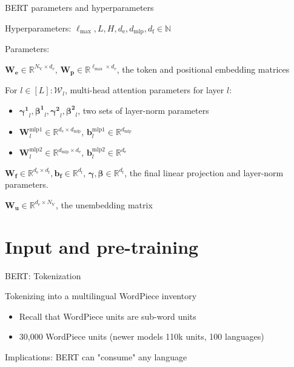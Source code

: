 \documentclass[12pt,aspectratio=169,handout]{beamer}
\begin{document}
\begin{frame}{BERT parameters and hyperparameters}
	
	\begin{minipage}[t][10cm][t]{15cm}
			
		Hyperparameters: $\ell_{\text{max}}, L, H, d_{\text{e}}, d_{\text{mlp}}, d_{\text{f}} \in \mathbb{N}$
		
		Parameters:
		
		$\bm{W_e} \in \mathbb{R}^{N_\text{V} \times d_\text{e}}$, $\bm{W_p} \in \mathbb{R}^{\ell_{\text{max}} \times d_\text{e}}$, the token and positional embedding matrices
		
		For $l \in [L]: \bm{\mathcal{W}}_l$, multi-head attention parameters for layer $l$:
		
		\begin{itemize}
		\item $\bm{\gamma^1}_l, \bm{\beta^1}_l, \bm{\gamma^2}_l, \bm{\beta^2}_l$, two sets of layer-norm parameters
		\item $\bm{W}^{\text{mlp1}}_l \in \mathbb{R}^{d_{\text{e}} \times d_\text{mlp}}$, $\bm{b}^{\text{mlp1}}_l \in \mathbb{R}^{d_\text{mlp}}$
		\item $\bm{W}^{\text{mlp2}}_l \in \mathbb{R}^{d_\text{mlp} \times d_{\text{e}}}$, $\bm{b}^{\text{mlp2}}_l \in \mathbb{R}^{d_\text{e}}$
		\end{itemize}
		
		
		
		
		$\bm{W_f} \in \mathbb{R}^{d_\text{e} \times d_\text{f}}, \bm{b_f} \in \mathbb{R}^{d_\text{f}}$, $\bm{\gamma},\bm{\beta} \in \mathbb{R}^{d_\text{f}}$, the final linear projection and layer-norm parameters.
		
		
		$\bm{W_u} \in \mathbb{R}^{d_\text{e} \times N_\text{V}}$, the unembedding matrix
		
	\end{minipage}
\end{frame}




\section{Input and pre-training}

\begin{frame}{BERT: Tokenization}
	
	Tokenizing into a multilingual WordPiece inventory
	
	\begin{itemize}
		\item Recall that WordPiece units are sub-word units
		\item 30,000 WordPiece units (newer models 110k units, 100 languages)
	\end{itemize}
	
	Implications: BERT can "consume" any language
	
	
\end{frame}
\end{document}
